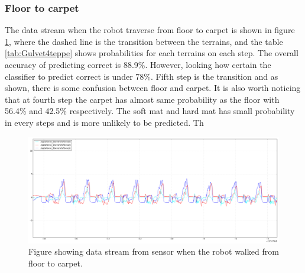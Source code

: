 \documentclass[USenglish]{ifimaster}  %
\begin{document}
\subsubsection{Floor to carpet}
The data stream when the robot traverse from floor to carpet is shown in figure \ref{fig:gulvet4teppegraf}, where the dashed line is the transition between the terrains, and the table \ref{tab:Gulvet4teppe} shows probabilities for each terrains on each step. The overall accuracy of predicting correct is 88.9\%. However, looking how certain the classifier to predict correct is under 78\%. Fifth step is the transition and as shown, there is some confusion between floor and carpet. It is also worth noticing that at fourth step the carpet has almost same probability as the floor with 56.4\% and 42.5\% respectively. The soft mat and hard mat has small probability in every steps and is more unlikely to be predicted. Th
	
	\begin{figure}[h]
		\centering
		\includegraphics[width=\textwidth,height=\textheight,keepaspectratio]{Figures/Gulvet4Teppe2}
		\caption{Figure showing data stream from sensor when the robot walked from floor to carpet.}
		\label{fig:gulvet4teppegraf}
	\end{figure}
	
\end{document}
